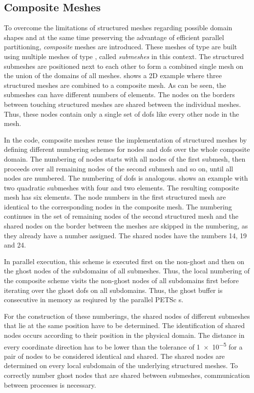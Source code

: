 \subsection{Composite Meshes}\label{sec:composite_meshes}

To overcome the limitations of structured meshes regarding possible domain shapes and at the same time preserving the advantage of efficient parallel partitioning, \emph{composite} meshes are introduced. These meshes of type  are built using multiple meshes of type , called \emph{submeshes} in this context. The structured submeshes are positioned next to each other to form a combined single mesh on the union of the domains of all meshes.  shows a 2D example where three structured meshes are combined to a composite mesh. As can be seen, the submeshes can have different numbers of elements.
The nodes on the borders between touching structured meshes are shared between the individual meshes. Thus, these nodes contain only a single set of dofs like every other node in the mesh.

In the code, composite meshes reuse the implementation of structured meshes by defining different numbering schemes for nodes and dofs over the whole composite domain. The numbering of nodes starts with all nodes of the first submesh, then proceeds over all remaining nodes of the second submesh and so on, until all nodes are numbered. The numbering of dofs is analogous.  shows an example with two quadratic submeshes with four and two elements. The resulting composite mesh has six elements. The node numbers in the first structured mesh are identical to the corresponding nodes in the composite mesh. The numbering continues in the set of remaining nodes of the second structured mesh and the shared nodes on the border between the meshes are skipped in the numbering, as they already have a number assigned. The shared nodes have the numbers 14, 19 and 24.

In parallel execution, this scheme is executed first on the non-ghost and then on the ghost nodes of the subdomains of all submeshes. Thus, the local numbering of the composite scheme visits the non-ghost nodes of all subdomains first before iterating over the ghost dofs on all subdomains. Thus, the ghost buffer is consecutive in memory as reqiured by the parallel PETSc \Vec{}s.

For the construction of these numberings, the shared nodes of different submeshes that lie at the same position have to be determined.
The identification of shared nodes occurs according to their position in the physical domain. The distance in every coordinate direction has to be lower than the tolerance of \num{1e-5} for a pair of nodes to be considered identical and shared. The shared nodes are determined on every local subdomain of the underlying structured meshes. To correctly number ghost nodes that are shared between submeshes, communication between processes is necessary.

